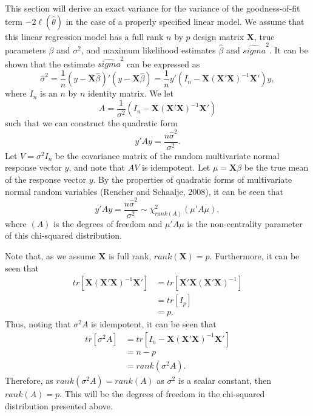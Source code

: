 This section will derive an exact variance for the variance of the goodness-of-fit term $-2 \ell (\hat{\theta} )$ in the case of a properly specified
linear model. We assume that this linear regression model has a full rank $n$ by $p$ design matrix $\mathbf{X}$, true parameters $\beta$ and $\sigma^2$,
and maximum likelihood estimates $\hat{\beta}$ and $\hat{sigma}^2$. It can be shown that the estimate $\hat{sigma}^2$ can be expressed as
\begin{equation}
	\hat{\sigma}^2 =  \frac{1}{n} (y-\mathbf{X}\hat{\beta})'(y-\mathbf{X}\hat{\beta}) = \frac{1}{n} y'(I_n - \mathbf{X}(\mathbf{X}'\mathbf{X})^{-1}\mathbf{X}')y ,
\end{equation}
where $I_n$ is an $n$ by $n$ identity matrix. We let
\begin{equation}
	A = \frac{1}{\sigma^2} (I_n - \mathbf{X}(\mathbf{X}'\mathbf{X})^{-1}\mathbf{X}') 
\end{equation}
such that we can construct the quadratic form
\begin{equation}
	y'Ay = \frac{n \hat{\sigma}^2}{\sigma^2} .
\end{equation}
Let $V = \sigma^2 I_n$ be the covariance matrix of the random multivariate normal response vector $y$, and note that $AV$ is idempotent. Let $\mu = \mathbf{X} \beta$ be the
true mean of the response vector $y$. By the properties of quadratic forms of multivariate normal random variables (Rencher and Schaalje, 2008), it can be seen that
\begin{equation}
	y'Ay = \frac{n \hat{\sigma}^2}{\sigma^2} \sim \chi^2_{rank \left( A \right) } (\mu 'A\mu) ,
\end{equation}
where $\left( A \right)$ is the degrees of freedom and $\mu 'A \mu$ is the non-centrality parameter of this chi-squared distribution.

Note that, as we assume $\mathbf{X}$ is full rank, $rank(\mathbf{X}) = p$. Furthermore, it can be seen that
\begin{equation}
	\begin{split}
	tr\left[ \mathbf{X}(\mathbf{X}'\mathbf{X})^{-1}\mathbf{X}' \right] & = tr \left[ \mathbf{X}'\mathbf{X}(\mathbf{X}'\mathbf{X})^{-1} \right]  \\ 
	& = tr \left[ I_p \right] \\
	& = p .
	\end{split}
\end{equation}
Thus, noting that $\sigma^2 A$ is idempotent, it can be seen that
\begin{equation}
	\begin{split}
	tr \left[ \sigma^2 A \right] & = tr \left[ I_n - \mathbf{X}(\mathbf{X}'\mathbf{X})^{-1}\mathbf{X}' \right]  \\ 
	& = n-p \\
	& = rank \left( \sigma^2 A \right) .
	\end{split}
\end{equation}
Therefore, as $rank \left( \sigma^2 A \right) = rank \left( A \right)$ as $\sigma^2$ is a scalar constant, then $rank \left( A \right) = p$. This will be the degrees of
freedom in the chi-squared distribution presented above.

